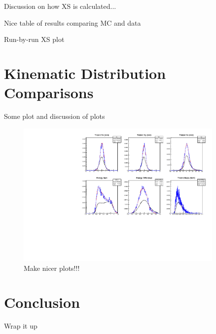 \documentclass[twoside]{article}
\begin{document}
Discussion on how XS is calculated...

Nice table of results comparing MC and data 

Run-by-run XS plot

\section{Kinematic Distribution Comparisons}

Some plot and discussion of plots


\begin{figure}[htbp]
  \centering
      \includegraphics[width=0.9\textwidth]{v0summary-norm-to-XS.pdf}
  \caption{Make nicer plots!!!}
  \label{rfsignal}
\end{figure}	



\section{Conclusion}

Wrap it up


\begin{thebibliography}{99} %
\end{thebibliography}


\end{document}
